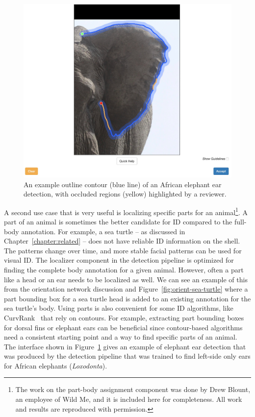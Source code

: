 \begin{figure}[!t]
    \begin{center}
        \includegraphics[width=0.90\linewidth]{resources/interface-contours.pdf}
    \end{center}
    \caption{An example outline contour (blue line) of an African elephant ear detection, with occluded regions (yellow) highlighted by a reviewer.}
    \label{fig:contour-interface}
\end{figure}

A second use case that is very useful is localizing specific parts for an animal\footnote{The work on the part-body assignment component was done by Drew Blount, an employee of Wild Me, and it is included here for completeness.  All work and results are reproduced with permission.}.  A part of an animal is sometimes the better candidate for ID compared to the full-body annotation.  For example, a sea turtle -- as discussed in Chapter~\ref{chapter:related} -- does not have reliable ID information on the shell.  The patterns change over time, and more stable facial patterns can be used for visual ID.  The localizer component in the detection pipeline is optimized for finding the complete body annotation for a given animal. However, often a part like a head or an ear needs to be localized as well.  We can see an example of this from the orientation network discussion and Figure~\ref{fig:orient-sea-turtle} where a part bounding box for a sea turtle head is added to an existing annotation for the sea turtle's body.  Using parts is also convenient for some ID algorithms, like CurvRank~\cite{weideman_contour-based_2019} that rely on contours. For example, extracting part bounding boxes for dorsal fins or elephant ears can be beneficial since contour-based algorithms need a consistent starting point and a way to find specific parts of an animal.  The interface shown in Figure~\ref{fig:contour-interface} gives an example of elephant ear detection that was produced by the detection pipeline that was trained to find left-side only ears for African elephants (\textit{Loxodonta}).

